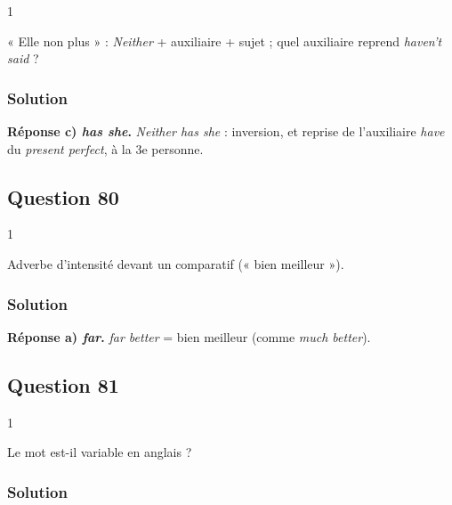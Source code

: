 \documentclass[11pt,a4paper]{article}
\begin{document}
\begin{indication}{1}

« Elle non plus » : \emph{Neither} + auxiliaire + sujet ; quel auxiliaire reprend \emph{haven't said} ?

\end{indication}

\hypertarget{solution-78}{%
\subsubsection{Solution}\label{solution-78}}

\textbf{Réponse c) \emph{has she}.} \emph{Neither has she} : inversion, et reprise de l'auxiliaire \emph{have} du \emph{present perfect}, à la 3e personne.

\hypertarget{question-80}{%
\subsection{Question 80}\label{question-80}}

\begin{indication}{1}

Adverbe d'intensité devant un comparatif (« bien meilleur »).

\end{indication}

\hypertarget{solution-79}{%
\subsubsection{Solution}\label{solution-79}}

\textbf{Réponse a) \emph{far}.} \emph{far better} = bien meilleur (comme \emph{much better}).

\hypertarget{question-81}{%
\subsection{Question 81}\label{question-81}}

\begin{indication}{1}

Le mot est-il variable en anglais ?

\end{indication}

\hypertarget{solution-80}{%
\subsubsection{Solution}\label{solution-80}}
\end{document}
